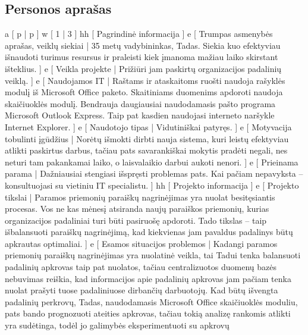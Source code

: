 \subsection{Personos aprašas}
\xtableu
{
  a [ p | p ]
  w [ 1 | 3 ]
  hh [ Pagrindinė informacija ]
  e [ Trumpas asmenybės aprašas, veiklų siekiai 
  | 
    35 metų vadybininkas, Tadas. Siekia kuo efektyviau išnaudoti turimus resursus ir praleisti
    kiek įmanoma mažiau laiko skirstant išteklius.
  ]
  e [ Veikla projekte 
  | 
    Prižiūri jam paskirtų organizacijos padalinių veiklą.
  ]
  e [ Naudojamos IT 
  | 
    Raštams ir ataskaitoms ruošti naudoja rašyklės modulį iš Microsoft Office paketo. Skaitiniams
    duomenims apdoroti naudoja skaičiuoklės modulį. Bendrauja daugiausiai naudodamasis pašto
    programa Microsoft Outlook Express. Taip pat kasdien naudojasi interneto naršykle
    Internet Explorer.
  ]
  e [ Naudotojo tipas 
  | 
    Vidutiniškai patyręs. 
  ]
  e [ Motyvacija tobulinti įgūdžius 
  |
    Norėtų išmokti dirbti nauja sistema, kuri leistų efektyviau atlikti paskirtus darbus, tačiau
    pats savarankiškai mokytis pradėti negali, nes neturi tam pakankamai laiko, o
    laisvalaikio darbui aukoti nenori.
  ]
  e [ Prieinama parama 
  | 
    Dažniausiai stengiasi išspręsti problemas pats. Kai pačiam
    nepavyksta – konsultuojasi su vietiniu IT specialistu.
  ]
  hh [ Projekto informacija ]
  e [ Projekto tikslai 
  | 
    Paramos priemonių paraiškų nagrinėjimas yra nuolat besitęsiantis procesas. Vos ne
    kas mėnesį atsiranda naujų paraiškos priemonių, kurias organizacijos padaliniai turi būti
    pasiruošę apdoroti. Tado tikslas – taip išbalansuoti paraiškų nagrinėjimą, kad kiekvienas
    jam pavaldus padalinys būtų apkrautas optimaliai.
  ]
  e [ Esamos situacijos problemos 
  | 
    Kadangi paramos priemonių paraiškų nagrinėjimas yra nuolatinė
    veikla, tai Tadui tenka  balansuoti padalinių apkrovas taip pat
    nuolatos, tačiau centralizuotos duomenų bazės nebuvimas reiškia,
    kad informacijos apie padalinių apkrovas jam pačiam tenka
    nuolat prašyti tuose padaliniuose dirbančių darbuotojų.
    Kad būtų išvengta padalinių perkrovų, Tadas, naudodamasis
    Microsoft Office skaičiuoklės moduliu, pats bando prognozuoti
    ateities apkrovas, tačiau tokią analizę rankomis atlikti yra
    sudėtinga, todėl jo galimybės eksperimentuoti su apkrovų
}
